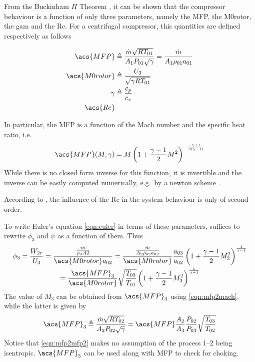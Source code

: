\documentclass[tcc]{subfiles}
\begin{document}


From the Buckinham $\Pi$ Theorem \cite{Buckingham1914}, 
it can be shown that the compressor behaviour is a function of only three parameters, 
namely the \acl{MFP}, the \acl{M0rotor}, the \acl{gam} and the \acl{Re}. 
For a centrifugal compressor, this quantities are defined respectively as follows

\begin{align}
    \acs{MFP} &\triangleq \MFP{1} = \MFPalt{1} \\
    \acs{M0rotor} &\triangleq \frac{U_3}{\sqrt{\gamma R T_{01}}} \\
    \gamma &\triangleq \frac{c_p}{c_v} \\
    \acs{Re} &
\end{align}

In particular, the \acl{MFP} is a function of the Mach number and the specific heat ratio,
 i.e.\
\begin{equation}
    \label{eqn:mfp2mach}
    \acs{MFP}(M,\gamma) = M \left( 1 + \frac{\gamma-1}{2}M^2\right)^{-\frac{\gamma+1}{2(\gamma-1)}}
\end{equation}
While there is no closed form inverse for this function, it is invertible and the inverse can be easily computed numerically, e.g.\ by a newton scheme \cite{Der1974}.

According to \textcite{walsh2004gas},
 the influence of the \acl{Re} in the system behaviour is only of second order.

To write Euler's equation \cref{eqn:euler} in terms of these parameters, suffices to rewrite $\phi_3$ and $\psi$ as a function of them. Thus
\begin{multline}
    \label{eqn:phi2_dimensionless}
    \phi_3 = \frac{W_{2r}}{U_3} 
           = \frac{\frac{\dot{m}}{\rho_3 A2}}{\acs{M0rotor} a_{02}}
           = \frac{\MFPalt{2}}{\acs{M0rotor}} \frac{a_{03}}{a_{02}} \stagdensratio{3} \\ 
           = \frac{\acs{MFP}_3}{\acs{M0rotor}} \sqrt{\frac{T_{03}}{T_{01}}} \stagdensratio{3}
\end{multline}
The value of $M_3$ can be obtained from $\acs{MFP}_3$ using \cref{eqn:mfp2mach}, while the latter is given by
\begin{equation}
    \label{eqn:mfp2mfp2}
    \acs{MFP}_3 \triangleq \MFP{2} = \acs{MFP} \frac{A_2}{A_3} \frac{P_{02}}{P_{03}} \sqrt{\frac{T_{03}}{T_{02}}}
\end{equation}
Notice that \cref{eqn:mfp2mfp2} makes no assumption of the process 1--2 being isentropic. $\acs{MFP}_3$ can be used along with \acs{MFP} to check for choking.
\end{document}
